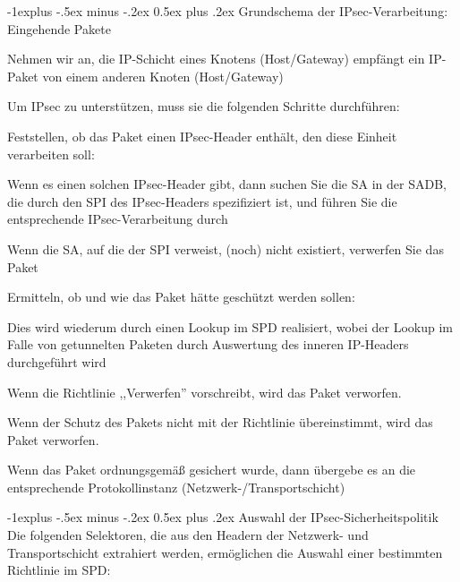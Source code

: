 \documentclass[a4paper]{article}
\makeatletter
\renewcommand{\subsection}{\@startsection{subsection}{2}{0mm}%
 {-1explus -.5ex minus -.2ex}%
 {0.5ex plus .2ex}%
 {\normalfont\normalsize\bfseries}}
\makeatother
\begin{document}
\begin{multicols}{3}
      \subsection{Grundschema der IPsec-Verarbeitung: Eingehende Pakete}
      \begin{itemize*}
            \item Nehmen wir an, die IP-Schicht eines Knotens (Host/Gateway) empfängt ein IP-Paket von einem anderen Knoten (Host/Gateway)
            \item Um IPsec zu unterstützen, muss sie die folgenden Schritte durchführen:
            \begin{itemize*}
                  \item Feststellen, ob das Paket einen IPsec-Header enthält, den diese Einheit verarbeiten soll:
                  \begin{itemize*}
                        \item Wenn es einen solchen IPsec-Header gibt, dann suchen Sie die SA in der SADB, die durch den SPI des IPsec-Headers spezifiziert ist, und führen Sie die entsprechende IPsec-Verarbeitung durch
                        \item Wenn die SA, auf die der SPI verweist, (noch) nicht existiert, verwerfen Sie das Paket
                  \end{itemize*}
                  \item Ermitteln, ob und wie das Paket hätte geschützt werden sollen:
                  \begin{itemize*}
                        \item Dies wird wiederum durch einen Lookup im SPD realisiert, wobei der Lookup im Falle von getunnelten Paketen durch Auswertung des inneren IP-Headers durchgeführt wird
                        \item Wenn die Richtlinie ,,Verwerfen'' vorschreibt, wird das Paket verworfen.
                        \item Wenn der Schutz des Pakets nicht mit der Richtlinie übereinstimmt, wird das Paket verworfen.
                        \item Wenn das Paket ordnungsgemäß gesichert wurde, dann übergebe es an die entsprechende Protokollinstanz (Netzwerk-/Transportschicht)
                  \end{itemize*}
            \end{itemize*}
      \end{itemize*}


      \subsection{Auswahl der IPsec-Sicherheitspolitik}
      Die folgenden Selektoren, die aus den Headern der Netzwerk- und
      Transportschicht extrahiert werden, ermöglichen die Auswahl einer
      bestimmten Richtlinie im SPD:


\end{multicols}
\end{document}
